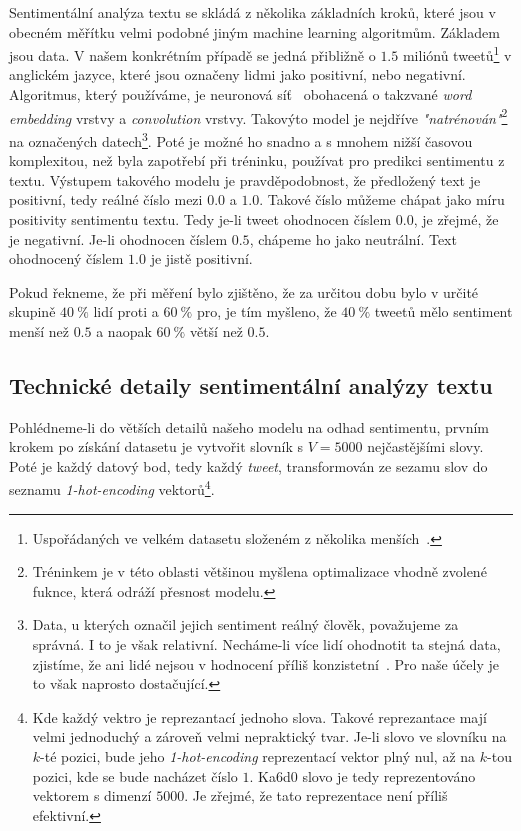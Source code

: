 \documentclass[12pt, a4paper]{article}
\numberwithin{equation}{section} 	%
\begin{document}
Sentimentální analýza textu se skládá z několika základních kroků, které jsou v obecném měřítku velmi podobné jiným machine learning algoritmům. Základem jsou data. V našem konkrétním případě se jedná přibližně o $1.5$ miliónů tweetů\footnote{Uspořádaných ve velkém datasetu složeném z několika menších~\cite{TwitterData1, TwitterData2}.} v anglickém jazyce, které jsou označeny lidmi jako positivní, nebo negativní. Algoritmus, který používáme, je neuronová síť~\cite{TwitterSentAnalysis} obohacená o takzvané \textit{word embedding} vrstvy a \textit{convolution} vrstvy. Takovýto model je nejdříve \textit{"natrénován"}\footnote{Tréninkem je v této oblasti většinou myšlena optimalizace vhodně zvolené fuknce, která odráží přesnost modelu.} na označených datech\footnote{Data, u kterých označil jejich sentiment reálný člověk, považujeme za správná. I to je však relativní. Necháme-li více lidí ohodnotit ta stejná data, zjistíme, že ani lidé nejsou v hodnocení příliš konzistetní~\cite{HumanVsMachineLearning}. Pro naše účely je to však naprosto dostačující.}. Poté je možné ho snadno a s mnohem nižší časovou komplexitou, než byla zapotřebí při tréninku, používat pro predikci sentimentu z textu. Výstupem takového modelu je pravděpodobnost, že předložený text je positivní, tedy reálné číslo mezi $0.0$ a $1.0$. Takové číslo můžeme chápat jako míru positivity sentimentu textu. Tedy je-li tweet ohodnocen číslem $0.0$, je zřejmé, že je negativní. Je-li ohodnocen číslem $0.5$, chápeme ho jako neutrální. Text ohodnocený číslem $1.0$ je jistě positivní.

Pokud řekneme, že při měření bylo zjištěno, že za určitou dobu bylo v určité skupině $40\ \%$ lidí proti a $60\ \%$ pro, je tím myšleno, že $40\ \%$ tweetů mělo sentiment menší než $0.5$ a naopak $60\ \%$ větší než $0.5$.

\subsection{Technické detaily sentimentální analýzy textu}
\noindent Pohlédneme-li do větších detailů našeho modelu na odhad sentimentu, prvním krokem po získání datasetu je vytvořit slovník s $V = 5000$ nejčastějšími slovy. Poté je každý datový bod, tedy každý \textit{tweet}, transformován ze sezamu slov do seznamu \textit{1-hot-encoding} vektorů\footnote{Kde každý vektro je reprezantací jednoho slova. Takové reprezantace mají velmi jednoduchý a zároveň velmi nepraktický tvar. Je-li slovo ve slovníku na $k$-té pozici, bude jeho \textit{1-hot-encoding} reprezentací vektor plný nul, až na $k$-tou pozici, kde se bude nacházet číslo $1$. Ka6d0 slovo je tedy reprezentováno vektorem s dimenzí $5000$. Je zřejmé, že tato reprezentace není příliš efektivní.}.
\end{document}
